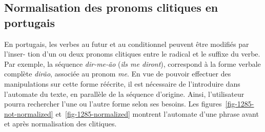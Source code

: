 \subsection{Normalisation des pronoms clitiques en portugais}
\label{section-portuguese-clitics}
En portugais, les verbes au futur et au conditionnel peuvent être modifiés par l’inser-
tion d’un ou deux pronoms clitiques entre le radical et le suffixe du verbe. Par exemple, la
séquence \textit{dir-me-ão} (\textit{ils me diront}), correspond à la forme verbale complète 
\textit{dirão}, associée au pronom \textit{me}. En vue de pouvoir effectuer des manipulations
sur cette forme réécrite, il est nécessaire de l’introduire dans l’automate du texte, en parallèle
de la séquence d’origine. Ainsi, l’utilisateur pourra rechercher l’une ou l’autre forme selon ses besoins. 
Les figures~\ref{fig-1285-not-normalized} et~\ref{fig-1285-normalized} montrent l’automate d’une phrase
avant et après normalisation des clitiques.


